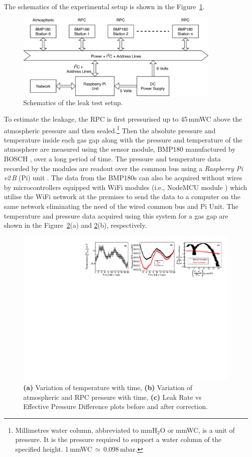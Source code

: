 \documentclass[a4paper,12pt,twoside,openany]{article}
\begin{document}
The schematics of the experimental setup is shown in the
Figure~\ref{fig:schematics}.
\begin{figure}
  \centering
  \includegraphics[width=0.9\textwidth]{leaktest_setup.png}
  \caption{Schematics of the leak test setup.}
  \label{fig:schematics}
\end{figure}
To estimate the leakage, the RPC is first pressurised up to 45\,mmWC
above the atmospheric pressure and then sealed.\footnote{Millimetres water column, abbreviated to mmH$_2$O or mmWC, is a unit of pressure. It is the pressure required to support a water column of the specified height. 1\,mmWC\,$\simeq$\,0.098\,mbar.}
Then the absolute pressure and temperature inside each gas gap along
with the pressure and temperature of the atmosphere are measured using
the sensor module, BMP180 manufactured by BOSCH \cite{bmp180}, over a
long period of time. The pressure and temperature data recorded by the
modules are readout over the common bus using a
\textit{Raspberry Pi\,v2\,B} (Pi) unit \cite{rpi}. The data from the
BMP180s can also be acquired without wires by microcontrollers
equipped with WiFi modules (i.e., NodeMCU module \cite{nodemcu2015})
which utilise the WiFi network at the premises to send the data to a
computer on the same network eliminating the need of the wired common
bus and Pi Unit. The temperature and pressure data acquired using this
system for a gas gap are shown in the Figure~\ref{fig:temp}(a) and
\ref{fig:temp}(b), respectively.
\begin{figure}[h!]
  \centering
  \includegraphics[width=0.99\textwidth]{all_57_3x1.pdf}
  \caption{\textbf{(a)} Variation of temperature with time,
    \textbf{(b)} Variation of atmospheric and RPC pressure with time,
    \textbf{(c)} Leak Rate vs Effective Pressure Difference plots
    before and after correction.}
  \label{fig:temp}
\end{figure}
\end{document}
